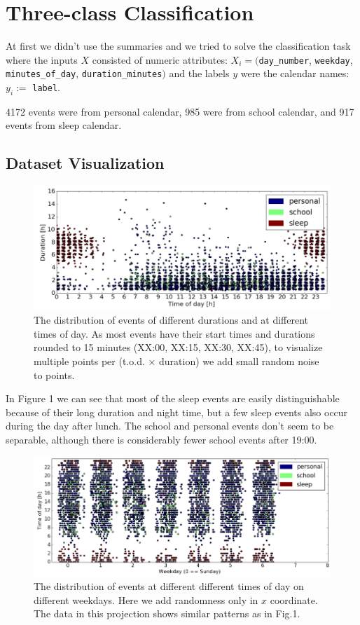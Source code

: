 \documentclass[a4paper, 12pt]{article}
\begin{document}
\section{Three-class Classification}
At first we didn't use the summaries and we tried to solve the classification task
where the inputs $X$ consisted of numeric attributes: $X_i = ($\texttt{day\_number}, 
\texttt{weekday}, \texttt{minutes\_of\_day}, \texttt{duration\_minutes}$)$ and the 
labels $y$ were the calendar names: $y_i := $ \texttt{label}.

4172 events were from personal calendar, 985 were from school calendar, 
and 917 events from sleep calendar.
    
\subsection{Dataset Visualization}
\begin{figure}[h]
\centerline{\includegraphics[width=1\textwidth]{3class-duration-vs-tod.png}}
\caption{The distribution of events of different durations and at different times
of day. As most events have their start times and durations rounded to 15 minutes
(XX:00, XX:15, XX:30, XX:45), to visualize multiple points per (t.o.d. $\times$ 
duration) we add small random noise to points.}
\end{figure}

In Figure 1 we can see that most of the sleep events are easily distinguishable because of their long
duration and night time, but a few sleep events also occur during the day after lunch.
The school and personal events don't seem to be separable, although there is 
considerably fewer school events after 19:00.

\begin{figure}[h!]
\centerline{\includegraphics[width=1\textwidth]{3class-tod-vs-weekday.png}}
\caption{The distribution of events at different different times of day on different 
weekdays. Here we add randomness only in $x$ coordinate. The data in this projection 
shows similar patterns as in Fig.1.}
\end{figure}
\end{document}
